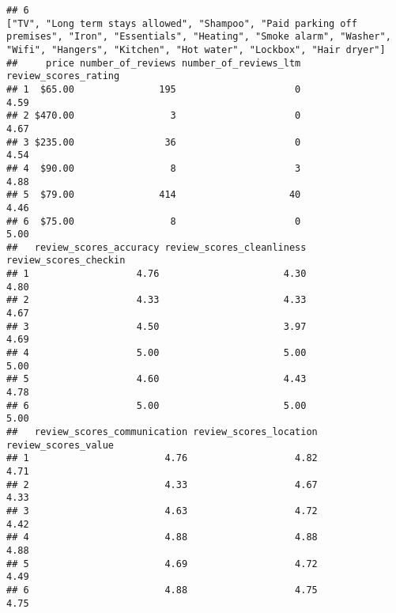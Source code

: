 \documentclass[
]{article}
\begin{document}
\begin{verbatim}
## 6                                                                                                                                                                                                                                                                                                                                                                                                                                                                                                                                                                                                                                                                                                                                                                                                                                     ["TV", "Long term stays allowed", "Shampoo", "Paid parking off premises", "Iron", "Essentials", "Heating", "Smoke alarm", "Washer", "Wifi", "Hangers", "Kitchen", "Hot water", "Lockbox", "Hair dryer"]
##     price number_of_reviews number_of_reviews_ltm review_scores_rating
## 1  $65.00               195                     0                 4.59
## 2 $470.00                 3                     0                 4.67
## 3 $235.00                36                     0                 4.54
## 4  $90.00                 8                     3                 4.88
## 5  $79.00               414                    40                 4.46
## 6  $75.00                 8                     0                 5.00
##   review_scores_accuracy review_scores_cleanliness review_scores_checkin
## 1                   4.76                      4.30                  4.80
## 2                   4.33                      4.33                  4.67
## 3                   4.50                      3.97                  4.69
## 4                   5.00                      5.00                  5.00
## 5                   4.60                      4.43                  4.78
## 6                   5.00                      5.00                  5.00
##   review_scores_communication review_scores_location review_scores_value
## 1                        4.76                   4.82                4.71
## 2                        4.33                   4.67                4.33
## 3                        4.63                   4.72                4.42
## 4                        4.88                   4.88                4.88
## 5                        4.69                   4.72                4.49
## 6                        4.88                   4.75                4.75
\end{verbatim}
\end{document}
